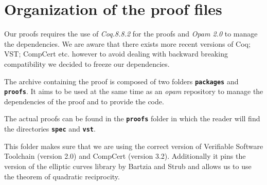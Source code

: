 \section{Organization of the proof files}
\label{appendix:proof-folders}

Our proofs requires the use of \emph{Coq.8.8.2} for the proofs and
\emph{Opam 2.0} to manage the dependencies. We are aware that there exists more
recent versions of Coq; VST; CompCert etc. however to avoid dealing with backward
breaking compatibility we decided to freeze our dependencies.

The archive containing the proof is composed of two folders \textbf{\texttt{packages}}
and \textbf{\texttt{proofs}}.
It aims to be used at the same time as an \emph{opam} repository to manage
the dependencies of the proof and to provide the code.

The actual proofs can be found in the \textbf{\texttt{proofs}} folder in which
the reader will find the directories \textbf{\texttt{spec}} and \textbf{\texttt{vst}}.

This folder makes sure that we are using the correct version of
Verifiable Software Toolchain (version 2.0) and CompCert (version 3.2).
Additionally it pins the version of the elliptic curves library by Bartzia and Strub
and allows us to use the theorem of quadratic reciprocity.

